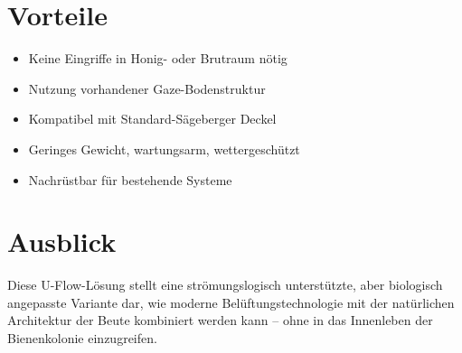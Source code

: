 \documentclass[11pt,a4paper]{article}
\begin{document}
\section*{Vorteile}

\begin{itemize}[leftmargin=1.5em]
  \item Keine Eingriffe in Honig- oder Brutraum nötig
  \item Nutzung vorhandener Gaze-Bodenstruktur
  \item Kompatibel mit Standard-Sägeberger Deckel
  \item Geringes Gewicht, wartungsarm, wettergeschützt
  \item Nachrüstbar für bestehende Systeme
\end{itemize}

\section*{Ausblick}

Diese U-Flow-Lösung stellt eine strömungslogisch unterstützte, aber biologisch angepasste Variante dar, wie moderne Belüftungstechnologie mit der natürlichen Architektur der Beute kombiniert werden kann – ohne in das Innenleben der Bienenkolonie einzugreifen.
\end{document}
